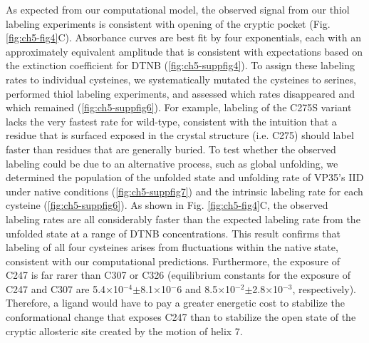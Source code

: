 \documentclass[../main.tex]{subfiles}
\begin{document}
        As expected from our computational model, the observed signal from our thiol labeling experiments is consistent with opening of the cryptic pocket (Fig. \ref{fig:ch5-fig4}C). Absorbance curves are best fit by four exponentials, each with an approximately equivalent amplitude that is consistent with expectations based on the extinction coefficient for DTNB (\ref{fig:ch5-suppfig4}). To assign these labeling rates to individual cysteines, we systematically mutated the cysteines to serines, performed thiol labeling experiments, and assessed which rates disappeared and which remained (\ref{fig:ch5-suppfig6}). For example, labeling of the C275S variant lacks the very fastest rate for wild-type, consistent with the intuition that a residue that is surfaced exposed in the crystal structure (i.e. C275) should label faster than residues that are generally buried. To test whether the observed labeling could be due to an alternative process, such as global unfolding, we determined the population of the unfolded state and unfolding rate of VP35’s IID under native conditions (\ref{fig:ch5-suppfig7}) and the intrinsic labeling rate for each cysteine (\ref{fig:ch5-suppfig6}). As shown in Fig. \ref{fig:ch5-fig4}C, the observed labeling rates are all considerably faster than the expected labeling rate from the unfolded state at a range of DTNB concentrations. This result confirms that labeling of all four cysteines arises from fluctuations within the native state, consistent with our computational predictions. Furthermore, the exposure of C247 is far rarer than C307 or C326 (equilibrium constants for the exposure of C247 and C307 are 5.4×10$^{-4}$$\pm$8.1$\times$10${^-6}$ and 8.5$\times$10$^{-2}$$\pm$2.8$\times$10$^{-3}$, respectively).  Therefore, a ligand would have to pay a greater energetic cost to stabilize the conformational change that exposes C247 than to stabilize the open state of the cryptic allosteric site created by the motion of helix 7.
\end{document}
